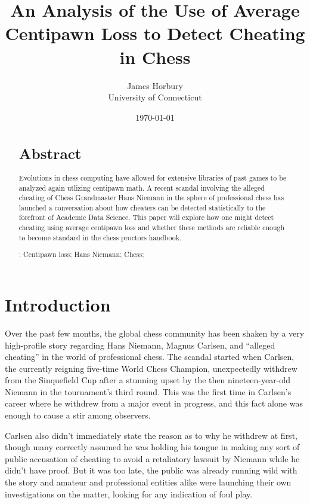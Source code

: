 \documentclass[12pt, letterpaper, titlepage]{article}
\title{An Analysis of the Use of Average Centipawn Loss to Detect Cheating in Chess}
\author{James Horbury\\
    University of Connecticut
}
\date{\today}
\begin{document}
\maketitle

\doublespace

\begin{abstract}
\section*{Abstract}
\label{sec:abs}

Evolutions in chess computing have allowed for extensive libraries of past games to be analyzed again utlizing centipawn math. A recent scandal involving the alleged cheating of Chess Grandmaster Hans Niemann in the sphere of professional chess has launched a conversation about how cheaters can be detected statistically to the forefront of Academic Data Science. This paper will explore how one might detect cheating using average centipawn loss and whether these methods are reliable enough to become standard in the chess proctors handbook.

\bigskip
\noindent{}:
Centipawn loss; 
Hans Niemann;
Chess;
\end{abstract}

\section*{Introduction}
\label{sec:intro}

Over the past few months, the global chess community has been shaken by a very high-profile story regarding Hans Niemann, Magnus Carlsen,  and “alleged cheating” in the world of professional chess. The scandal started when Carlsen, the currently reigning five-time World Chess Champion, unexpectedly withdrew from the Sinquefield Cup after a stunning upset by the then nineteen-year-old Niemann in the tournament's third round. This was the first time in Carlsen's career where he withdrew from a major event in progress, and this fact alone was enough to cause a stir among observers\citep{wsj2022}.

Carlsen also didn't immediately state the reason as to why he withdrew at first, though many correctly assumed he was holding his tongue in making any sort of public accusation of cheating to avoid a retaliatory lawsuit by Niemann while he didn't have proof. But it was too late, the public was already running wild with the story and amateur and professional entities alike were launching their own investigations on the matter, looking for any indication of foul play.
\end{document}
